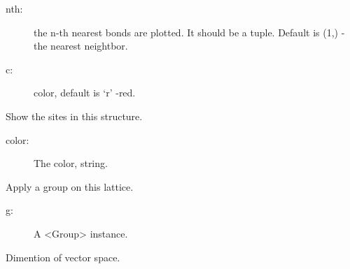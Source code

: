 \documentclass[letterpaper,10pt,oneside,openany]{sphinxmanual}
\begin{document}
\begin{fulllineitems}
\begin{fulllineitems}
\begin{description}
\item[{nth:}] \leavevmode
the n-th nearest bonds are plotted. It should be a tuple.
Default is (1,) - the nearest neightbor.

\item[{c:}] \leavevmode
color, default is `r' -red.

\end{description}

\end{fulllineitems}


\begin{fulllineitems}
\label{index:lattice.structure.Structure.show_sites}
Show the sites in this structure.
\begin{description}
\item[{color:}] \leavevmode
The color, string.

\end{description}

\end{fulllineitems}


\begin{fulllineitems}
\label{index:lattice.structure.Structure.usegroup}
Apply a group on this lattice.
\begin{description}
\item[{g: }] \leavevmode
A \textless{}Group\textgreater{} instance.

\end{description}

\end{fulllineitems}


\begin{fulllineitems}
\label{index:lattice.structure.Structure.vdim}
Dimention of vector space.

\end{fulllineitems}


\end{fulllineitems}

\end{document}
